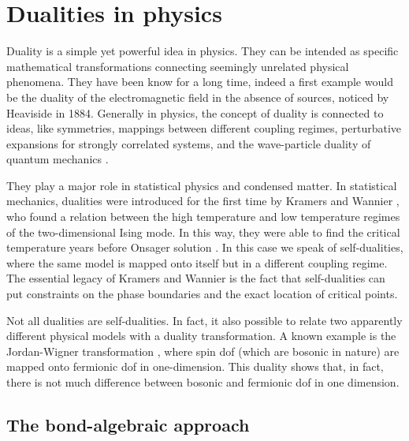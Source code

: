 \section{Dualities in physics}%
\label{sec:dualities_in_physics}


Duality is a simple yet powerful idea in physics.
They can be intended as specific mathematical transformations connecting seemingly unrelated physical phenomena.
They have been know for a long time, indeed a first example would be the duality of the electromagnetic field in the absence of sources, noticed by Heaviside in 1884.
Generally in physics, the concept of duality is connected to ideas, like symmetries, mappings between different coupling regimes, perturbative expansions for strongly correlated systems, and the wave-particle duality of quantum mechanics \cite{savit1980duality, cobanera2011bond}.

They play a major role in statistical physics and condensed matter.
In statistical mechanics, dualities were introduced for the first time by Kramers and Wannier \cite{kramers1941statistics}, who found a relation between the high temperature and low temperature regimes of the two-dimensional Ising mode.
In this way, they were able to find the critical temperature years before Onsager solution \cite{onsager1944ising}.
In this case we speak of self-dualities, where the same model is mapped onto itself but in a different coupling regime.
The essential legacy of Kramers and Wannier is the fact that self-dualities can put constraints on the phase boundaries and the exact location of critical points.

Not all dualities are self-dualities.
In fact, it also possible to relate two apparently different physical models with a duality transformation.
A known example is the Jordan-Wigner transformation \cite{schultz1964ising, jordan1928pauli}, where spin \ac{dof} (which are bosonic in nature) are mapped onto fermionic \ac{dof} in one-dimension.
This duality shows that, in fact, there is not much difference between bosonic and fermionic \ac{dof} in one dimension.


%
%
\subsection{The bond-algebraic approach}
\label{sub:the_bond_algebraic_approach}


